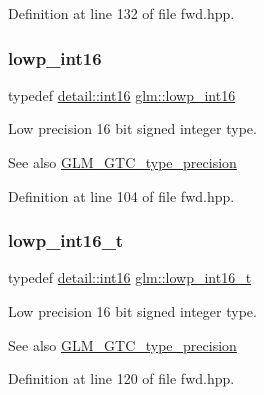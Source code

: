 Definition at line 132 of file fwd.\+hpp.

\mbox{\label{group__gtc__type__precision_ga71fc0c399fa4780507748b643733f153}} 
\subsubsection{\texorpdfstring{lowp\_int16}{lowp\_int16}}
{\footnotesize\ttfamily typedef \mbox{\hyperlink{namespaceglm_1_1detail_a375938874ca4f0a0982ec6373b56117b}{detail\+::int16}} \mbox{\hyperlink{group__gtc__type__precision_ga71fc0c399fa4780507748b643733f153}{glm\+::lowp\+\_\+int16}}}

Low precision 16 bit signed integer type. \begin{DoxySeeAlso}{See also}
\mbox{\hyperlink{group__gtc__type__precision}{G\+L\+M\+\_\+\+G\+T\+C\+\_\+type\+\_\+precision}} 
\end{DoxySeeAlso}


Definition at line 104 of file fwd.\+hpp.

\mbox{\label{group__gtc__type__precision_gae34c3d53c4c1434fc9f26538b0185667}} 
\subsubsection{\texorpdfstring{lowp\_int16\_t}{lowp\_int16\_t}}
{\footnotesize\ttfamily typedef \mbox{\hyperlink{namespaceglm_1_1detail_a375938874ca4f0a0982ec6373b56117b}{detail\+::int16}} \mbox{\hyperlink{group__gtc__type__precision_gae34c3d53c4c1434fc9f26538b0185667}{glm\+::lowp\+\_\+int16\+\_\+t}}}

Low precision 16 bit signed integer type. \begin{DoxySeeAlso}{See also}
\mbox{\hyperlink{group__gtc__type__precision}{G\+L\+M\+\_\+\+G\+T\+C\+\_\+type\+\_\+precision}} 
\end{DoxySeeAlso}


Definition at line 120 of file fwd.\+hpp.

\mbox{\label{group__gtc__type__precision_gad9939c9d6fec1c6accc02a83c6500f08}} 
